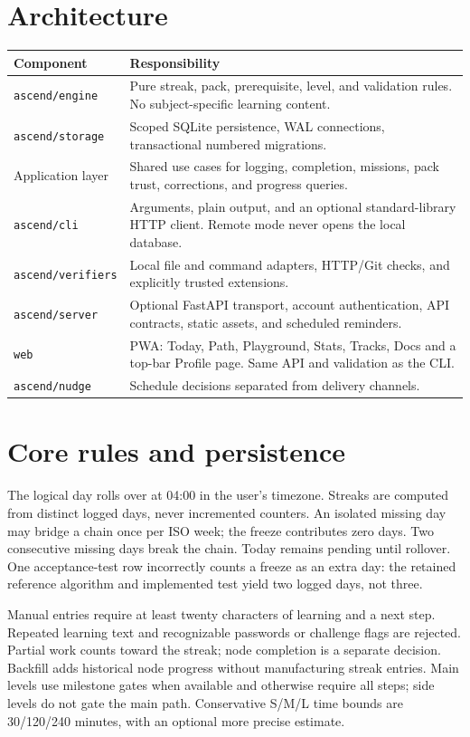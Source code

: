 \documentclass[11pt,a4paper]{article}
\begin{document}
\section{Architecture}
\begin{longtable}{p{}p{}}
\textbf{Component} & \textbf{Responsibility} \\
\hline
\texttt{ascend/engine} & Pure streak, pack, prerequisite, level, and validation rules. No subject-specific learning content. \\
\texttt{ascend/storage} & Scoped SQLite persistence, WAL connections, transactional numbered migrations. \\
Application layer & Shared use cases for logging, completion, missions, pack trust, corrections, and progress queries. \\
\texttt{ascend/cli} & Arguments, plain output, and an optional standard-library HTTP client. Remote mode never opens the local database. \\
\texttt{ascend/verifiers} & Local file and command adapters, HTTP/Git checks, and explicitly trusted extensions. \\
\texttt{ascend/server} & Optional FastAPI transport, account authentication, API contracts, static assets, and scheduled reminders. \\
\texttt{web} & PWA: Today, Path, Playground, Stats, Tracks, Docs and a top-bar Profile page. Same API and validation as the CLI. \\
\texttt{ascend/nudge} & Schedule decisions separated from delivery channels. \\
\end{longtable}

\section{Core rules and persistence}
The logical day rolls over at 04:00 in the user's timezone. Streaks are computed
from distinct logged days, never incremented counters. An isolated missing day
may bridge a chain once per ISO week; the freeze contributes zero days. Two
consecutive missing days break the chain. Today remains pending until rollover.
One acceptance-test row incorrectly counts a freeze as an extra day: the retained
reference algorithm and implemented test yield two logged days, not three.

Manual entries require at least twenty characters of learning and a next step.
Repeated learning text and recognizable passwords or challenge flags are rejected.
Partial work counts toward the streak; node completion is a separate decision.
Backfill adds historical node progress without manufacturing streak entries.
Main levels use milestone gates when available and otherwise require all steps;
side levels do not gate the main path. Conservative S/M/L time bounds are
30/120/240 minutes, with an optional more precise estimate.
\end{document}
